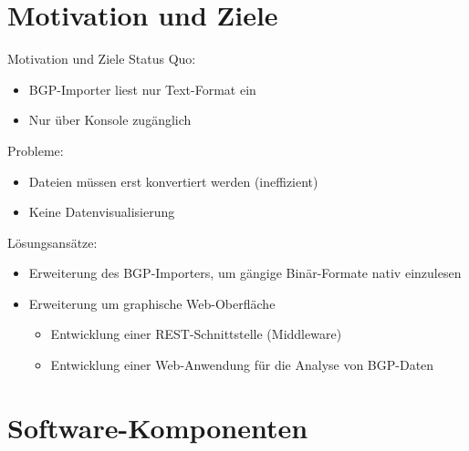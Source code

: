 \documentclass[9pt]{beamer}
\begin{document}
\section{Motivation und Ziele}

\begin{frame}{Motivation und Ziele}{}
   Status Quo:
	\begin{itemize}
		\item BGP-Importer liest nur Text-Format ein
		\item Nur über Konsole zugänglich
		\end{itemize}
		\vspace{0,2cm}		
	Probleme:
		\begin{itemize}
		\item Dateien müssen erst konvertiert werden (ineffizient)
		\item Keine Datenvisualisierung
		\end{itemize}
		\vspace{0,2cm}
	Lösungsansätze:
		\begin{itemize}
			\item Erweiterung des BGP-Importers, um gängige Binär-Formate nativ 
			         einzulesen
			\item Erweiterung um graphische Web-Oberfläche
			\vspace{0,1cm}
		\begin{itemize}
			\item Entwicklung einer REST-Schnittstelle (Middleware)
			\item Entwicklung einer Web-Anwendung für die Analyse von BGP-Daten
		\end{itemize}
		\end{itemize}
\end{frame}

\section{Software-Komponenten}
\end{document}
